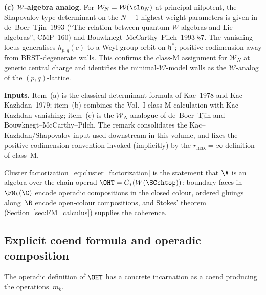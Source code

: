 \begin{remark}
\smallskip
\textbf{(c) $\mathcal W$-algebra analog.} For $\mathcal W_N = \mathcal W(\sln_N)$
at principal nilpotent, the Shapovalov-type determinant on the $N-1$ highest-weight parameters is
given in de~Boer--Tjin~1993 \cite{deBoerTjin93} (``The relation between
quantum $W$-algebras and Lie algebras'', CMP~160)
and Bouwknegt--McCarthy--Pilch~1993 \cite{BMP-Wsymmetry} \S7.
The vanishing locus generalises $h_{p,q}(c)$ to a Weyl-group orbit on
$\mathfrak h^\ast$; positive-codimension away from BRST-degenerate walls.
This confirms the class-M assignment for $\mathcal W_N$ at generic central
charge and identifies the minimal-$\mathcal W$-model walls as the
$\mathcal W$-analog of the $(p,q)$-lattice.

\smallskip
\textbf{Inputs.} Item~(a) is the classical determinant formula of
Kac~1978 and Kac--Kazhdan~1979; item~(b) combines the Vol.~I class-M
calculation with Kac--Kazhdan vanishing; item~(c) is the
$\mathcal W_N$ analogue of de~Boer--Tjin and Bouwknegt--McCarthy--Pilch.
The remark consolidates the Kac--Kazhdan/Shapovalov input used
downstream in this volume, and fixes the positive-codimension
convention invoked (implicitly) by the $r_{\max}=\infty$ definition
of class~M.
\end{remark}

\begin{remark}
\label{rem:factorization-as-operadic-composition}
Cluster factorization~\eqref{eq:cluster_factorization} is the statement that $\A$ is an algebra over the chain operad $\OHT = C_\ast(W(\SCchtop))$: boundary faces in $\FM_k(\C)$ encode operadic compositions in the closed colour, ordered gluings along~$\R$ encode open-colour compositions, and Stokes' theorem (Section~\ref{sec:FM_calculus}) supplies the coherence.
\end{remark}

\subsection{Explicit coend formula and operadic composition}

The operadic definition of $\OHT$ has a concrete incarnation as a coend producing the operations~$m_k$.

